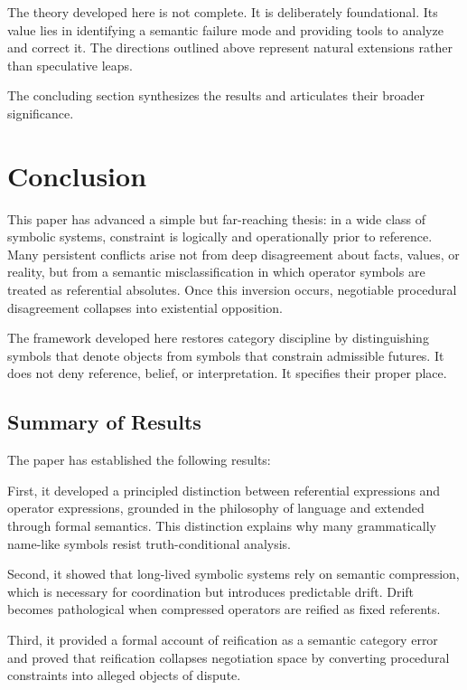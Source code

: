 \documentclass[11pt]{article}
\begin{document}
The theory developed here is not complete. It is deliberately foundational. Its
value lies in identifying a semantic failure mode and providing tools to analyze
and correct it. The directions outlined above represent natural extensions rather
than speculative leaps.

The concluding section synthesizes the results and articulates their broader
significance.

\section{Conclusion}

This paper has advanced a simple but far-reaching thesis: in a wide class of
symbolic systems, constraint is logically and operationally prior to reference.
Many persistent conflicts arise not from deep disagreement about facts, values,
or reality, but from a semantic misclassification in which operator symbols are
treated as referential absolutes. Once this inversion occurs, negotiable
procedural disagreement collapses into existential opposition.

The framework developed here restores category discipline by distinguishing
symbols that denote objects from symbols that constrain admissible futures. It
does not deny reference, belief, or interpretation. It specifies their proper
place.

\subsection{Summary of Results}

The paper has established the following results:

First, it developed a principled distinction between referential expressions and
operator expressions, grounded in the philosophy of language and extended through
formal semantics. This distinction explains why many grammatically name-like
symbols resist truth-conditional analysis.

Second, it showed that long-lived symbolic systems rely on semantic compression,
which is necessary for coordination but introduces predictable drift. Drift
becomes pathological when compressed operators are reified as fixed referents.

Third, it provided a formal account of reification as a semantic category error
and proved that reification collapses negotiation space by converting procedural
constraints into alleged objects of dispute.
\end{document}
